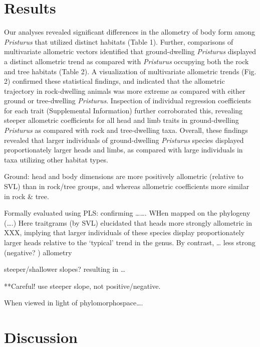 \documentclass[
]{article}
\begin{document}
\hypertarget{results}{%
\section{Results}\label{results}}

Our analyses revealed significant differences in the allometry of body
form among \emph{Pristurus} that utilized distinct habitats (Table 1).
Further, comparisons of multivariate allometric vectors identified that
ground-dwelling \emph{Pristurus} displayed a distinct allometric trend
as compared with \emph{Pristurus} occupying both the rock and tree
habitats (Table 2). A visualization of multivariate allometric trends
(Fig. 2) confirmed these statistical findings, and indicated that the
allometric trajectory in rock-dwelling animals was more extreme as
compared with either ground or tree-dwelling \emph{Pristurus}.
Inspection of individual regression coefficients for each trait
(Supplemental Information) further corroborated this, revealing steeper
allometric coefficients for all head and limb traits in ground-dwelling
\emph{Pristurus} as compared with rock and tree-dwelling taxa. Overall,
these findings revealed that larger individuals of ground-dwelling
\emph{Pristurus} species displayed proportionately larger heads and
limbs, as compared with large individuals in taxa utilizing other
habitat types. \hfill\break

Ground: head and body dimensions are more positively allometric
(relative to SVL) than in rock/tree groups, and whereas allometric
coefficients more similar in rock \& tree.

Formally evaluated using PLS: confirming \ldots\ldots. WHen mapped on
the phylogeny (\ldots.) Here traitgrams (by SVL) elucidated that heads
more strongly allometric in XXX, implying that larger individuals of
these species display proportionately larger heads relative to the
`typical' trend in the genus. By contrast, \ldots{} less strong
(negative? ) allometry

steeper/shallower slopes? resulting in \ldots{}

**Careful! use steeper slope, not positive/negative.

When viewed in light of phylomorphospace\ldots.

\hypertarget{discussion}{%
\section{Discussion}\label{discussion}}

\newpage
\end{document}
